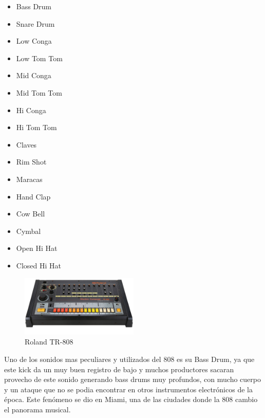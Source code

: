 \documentclass{article}
\begin{document}
\begin{multicols}{3}
    \begin{itemize}
        \item Bass Drum
        \item Snare Drum
        \item Low Conga
        \item Low Tom Tom
        \item Mid Conga
        \item Mid Tom Tom
        \item Hi Conga
        \item Hi Tom Tom
        \item Claves
        \item Rim Shot
        \item Maracas
        \item Hand Clap
        \item Cow Bell
        \item Cymbal
        \item Open Hi Hat
        \item Closed Hi Hat
    \end{itemize}
\end{multicols}

\endgroup

\begingroup
\setlength{\intextsep}{0pt}%
\setlength{\columnsep}{0pt}%

\begin{figure}
    \centering
    \includegraphics[width=0.5\textwidth]{images/tr808.jpg}
    \vspace{-3pt}
    \caption{Roland TR-808}
\end{figure}

Uno de los sonidos mas peculiares y utilizados del 808 es su Bass Drum, ya que este kick da un muy buen registro de bajo y muchos productores sacaran provecho de este sonido generando bass drums muy profundos, con mucho cuerpo y un ataque que no se podia encontrar en otros instrumentos electrónicos de la época. Este fenómeno se dio en Miami, una de las ciudades donde la 808 cambio el panorama musical.\cite{808film}\\
\end{document}
